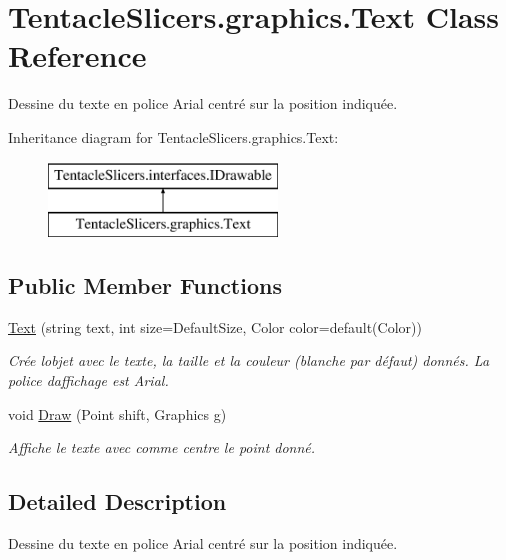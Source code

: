 \hypertarget{class_tentacle_slicers_1_1graphics_1_1_text}{}\section{Tentacle\+Slicers.\+graphics.\+Text Class Reference}
\label{class_tentacle_slicers_1_1graphics_1_1_text}


Dessine du texte en police Arial centré sur la position indiquée.  


Inheritance diagram for Tentacle\+Slicers.\+graphics.\+Text\+:\begin{figure}[H]
\begin{center}
\leavevmode
\includegraphics[height=2.000000cm]{class_tentacle_slicers_1_1graphics_1_1_text}
\end{center}
\end{figure}
\subsection*{Public Member Functions}
\begin{DoxyCompactItemize}
\item 
\hyperlink{class_tentacle_slicers_1_1graphics_1_1_text_aaf4c62f6a96a2316e37e5da8482dab20}{Text} (string text, int size=Default\+Size, Color color=default(Color))
\begin{DoxyCompactList}\small\item\em Crée l\textquotesingle{}objet avec le texte, la taille et la couleur (blanche par défaut) donnés. La police d\textquotesingle{}affichage est Arial. \end{DoxyCompactList}\item 
void \hyperlink{class_tentacle_slicers_1_1graphics_1_1_text_a42f965f26802e8593a4dbf0bda1939ea}{Draw} (Point shift, Graphics g)
\begin{DoxyCompactList}\small\item\em Affiche le texte avec comme centre le point donné. \end{DoxyCompactList}\end{DoxyCompactItemize}


\subsection{Detailed Description}
Dessine du texte en police Arial centré sur la position indiquée. 



